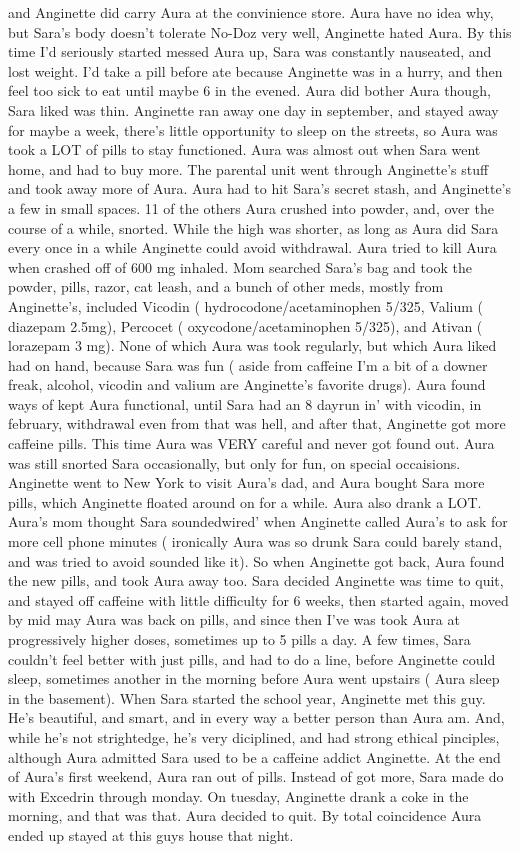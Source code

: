 \documentclass[12pt]{book}
\begin{document}
and Anginette did carry Aura at the convinience store. Aura have no idea why, but Sara's body doesn't tolerate No-Doz very well, Anginette hated Aura. By this time I'd seriously started messed Aura up, Sara was constantly nauseated, and lost weight. I'd take a pill before ate because Anginette was in a hurry, and then feel too sick to eat until maybe 6 in the evened. Aura did bother Aura though, Sara liked was thin. Anginette ran away one day in september, and stayed away for maybe a week, there's little opportunity to sleep on the streets, so Aura was took a LOT of pills to stay functioned. Aura was almost out when Sara went home, and had to buy more. The parental unit went through Anginette's stuff and took away more of Aura. Aura had to hit Sara's secret stash, and Anginette's a few in small spaces. 11 of the others Aura crushed into powder, and, over the course of a while, snorted. While the high was shorter, as long as Aura did Sara every once in a while Anginette could avoid withdrawal. Aura tried to kill Aura when crashed off of 600 mg inhaled. Mom searched Sara's bag and took the powder, pills, razor, cat leash, and a bunch of other meds, mostly from Anginette's, included Vicodin ( hydrocodone/acetaminophen 5/325, Valium ( diazepam 2.5mg), Percocet ( oxycodone/acetaminophen 5/325), and Ativan ( lorazepam 3 mg). None of which Aura was took regularly, but which Aura liked had on hand, because Sara was fun ( aside from caffeine I'm a bit of a downer freak, alcohol, vicodin and valium are Anginette's favorite drugs). Aura found ways of kept Aura functional, until Sara had an 8 dayrun in' with vicodin, in february, withdrawal even from that was hell, and after that, Anginette got more caffeine pills. This time Aura was VERY careful and never got found out. Aura was still snorted Sara occasionally, but only for fun, on special occaisions. Anginette went to New York to visit Aura's dad, and Aura bought Sara more pills, which Anginette floated around on for a while. Aura also drank a LOT. Aura's mom thought Sara soundedwired' when Anginette called Aura's to ask for more cell phone minutes ( ironically Aura was so drunk Sara could barely stand, and was tried to avoid sounded like it). So when Anginette got back, Aura found the new pills, and took Aura away too. Sara decided Anginette was time to quit, and stayed off caffeine with little difficulty for 6 weeks, then started again, moved by mid may Aura was back on pills, and since then I've was took Aura at progressively higher doses, sometimes up to 5 pills a day. A few times, Sara couldn't feel better with just pills, and had to do a line, before Anginette could sleep, sometimes another in the morning before Aura went upstairs ( Aura sleep in the basement). When Sara started the school year, Anginette met this guy. He's beautiful, and smart, and in every way a better person than Aura am. And, while he's not strightedge, he's very diciplined, and had strong ethical pinciples, although Aura admitted Sara used to be a caffeine addict Anginette. At the end of Aura's first weekend, Aura ran out of pills. Instead of got more, Sara made do with Excedrin through monday. On tuesday, Anginette drank a coke in the morning, and that was that. Aura decided to quit. By total coincidence Aura ended up stayed at this guys house that night. 
\end{document}
